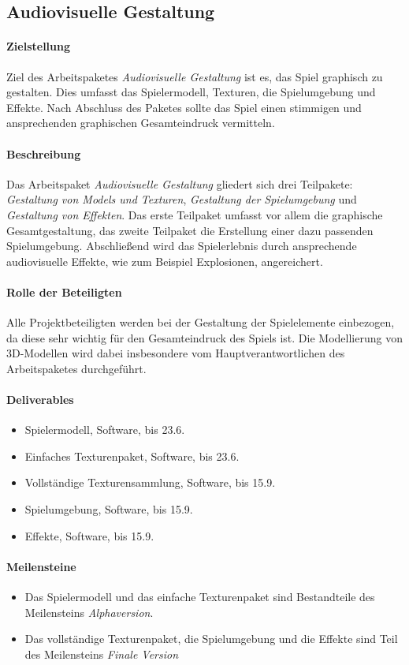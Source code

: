 \subsection{Audiovisuelle Gestaltung}
\label{ap7}

\paragraph{Zielstellung}\noindent
Ziel des Arbeitspaketes \textit{Audiovisuelle Gestaltung} ist es, das Spiel graphisch zu gestalten. Dies umfasst das Spielermodell, Texturen, die Spielumgebung und Effekte. Nach Abschluss des Paketes sollte das Spiel einen stimmigen und ansprechenden graphischen Gesamteindruck vermitteln.

\paragraph{Beschreibung}\noindent
Das Arbeitspaket \textit{Audiovisuelle Gestaltung} gliedert sich drei Teilpakete: \textit{Gestaltung von Models und Texturen}, \textit{Gestaltung der Spielumgebung} und \textit{Gestaltung von Effekten}. Das erste Teilpaket umfasst vor allem die graphische Gesamtgestaltung, das zweite Teilpaket die Erstellung einer dazu passenden Spielumgebung. Abschließend wird das Spielerlebnis durch ansprechende audiovisuelle Effekte, wie zum Beispiel Explosionen, angereichert.

\paragraph{Rolle der Beteiligten}\noindent
Alle Projektbeteiligten werden bei der Gestaltung der Spielelemente einbezogen, da diese sehr wichtig für den Gesamteindruck des Spiels ist. Die Modellierung von 3D-Modellen wird dabei insbesondere vom Hauptverantwortlichen des Arbeitspaketes durchgeführt.

\paragraph{Deliverables}\noindent
\begin{itemize}
\item Spielermodell, Software, bis 23.6.
\item Einfaches Texturenpaket, Software, bis 23.6.
\item Vollständige Texturensammlung, Software, bis 15.9.
\item Spielumgebung, Software, bis 15.9.
\item Effekte, Software, bis 15.9.
\end{itemize}

\paragraph{Meilensteine}\noindent
\begin{itemize}
\item Das Spielermodell und das einfache Texturenpaket sind Bestandteile des Meilensteins \textit{Alphaversion}.
\item Das vollständige Texturenpaket, die Spielumgebung und die Effekte sind Teil des Meilensteins \textit{Finale Version}
\end{itemize}